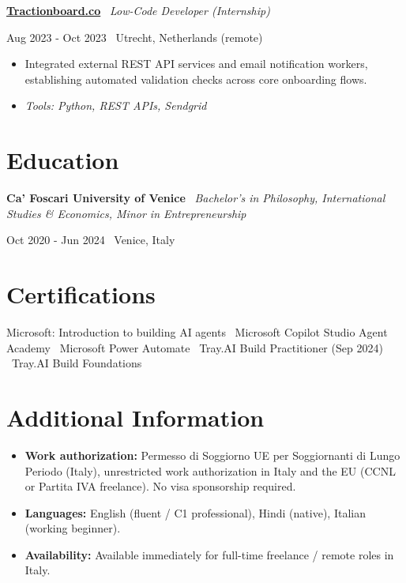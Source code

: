 \documentclass[a4paper,10pt]{article}
\newcommand{\role}[4]{%
  \vspace{2pt}\noindent
  \begin{minipage}[t]{0.70\textwidth}\raggedright\textbf{#1} \textbullet\ \textit{#3}\end{minipage}%
  \hfill
  \begin{minipage}[t]{0.28\textwidth}\raggedleft\footnotesize\color{gray}#2 \textbullet\ #4\end{minipage}%
  \vspace{1pt}%
}
\begin{document}
\role{\href{https://tractionboard.co}{Tractionboard.co}}{Aug 2023 - Oct 2023}{Low-Code Developer (Internship)}{Utrecht, Netherlands (remote)}
\begin{itemize}
  \item Integrated external REST API services and email notification workers, establishing automated validation checks across core onboarding flows.
  \item \textit{Tools: Python, REST APIs, Sendgrid}
\end{itemize}

\section{Education}
\role{Ca' Foscari University of Venice}{Oct 2020 - Jun 2024}{Bachelor's in Philosophy, International Studies \& Economics, Minor in Entrepreneurship}{Venice, Italy}

\section{Certifications}
Microsoft: Introduction to building AI agents \textbullet\ Microsoft Copilot Studio Agent Academy \textbullet\ Microsoft Power Automate \textbullet\ Tray.AI Build Practitioner (Sep 2024) \textbullet\ Tray.AI Build Foundations

\section{Additional Information}
\begin{itemize}
  \item \textbf{Work authorization:} Permesso di Soggiorno UE per Soggiornanti di Lungo Periodo (Italy), unrestricted work authorization in Italy and the EU (CCNL or Partita IVA freelance). No visa sponsorship required.
  \item \textbf{Languages:} English (fluent / C1 professional), Hindi (native), Italian (working beginner).
  \item \textbf{Availability:} Available immediately for full-time freelance / remote roles in Italy.
\end{itemize}

\end{document}
